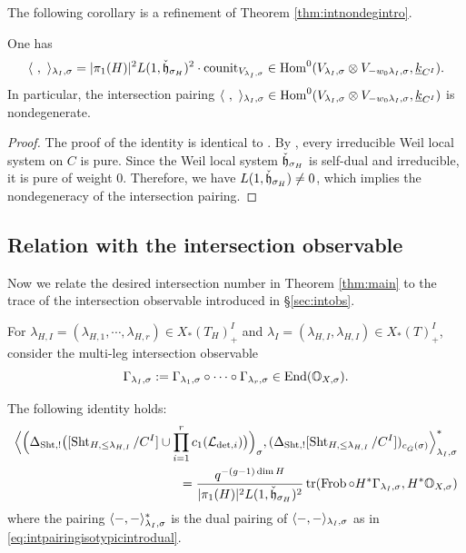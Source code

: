 \documentclass[reqno]{amsart}
\numberwithin{equation}{section}
\numberwithin{equation}{section}
\begin{document}
The following corollary is a refinement of Theorem \ref{thm:intnondegintro}.
\begin{cor}\label{cor:intnondegenerate}
    One has \begin{equation}
        \langle~,~\rangle_{\lambda_I,\sigma}=|\pi_1(H)|^2L(1, \check{\mathfrak{h}}_{\sigma_H})^2\cdot  \mathrm{counit}_{V_{\lambda_I,\sigma}}\in \operatorname{Hom}^0(V_{\lambda_I,\sigma}\otimes V_{-w_0\lambda_I,\sigma}, \underline{k}_{C^I})
    .\end{equation} In particular, the intersection pairing $\langle~,~\rangle_{\lambda_I,\sigma}\in \operatorname{Hom}^0(V_{\lambda_I,\sigma}\otimes V_{-w_0\lambda_I,\sigma}, \underline{k}_{C^I})$ is nondegenerate.
\end{cor}


\begin{proof}
    The proof of the identity is identical to \cite[\S6.3.2]{wang2025specialcycleshtukascategorical}. By \cite{lafforgue2002chtoucas}, every irreducible Weil local system on $C$ is pure. Since the Weil local system $\check{\mathfrak{h}}_{\sigma_H}$ is self-dual and irreducible, it is pure of weight $0$. Therefore, we have $L(1,\check{\mathfrak{h}}_{\sigma_H})\neq 0$, which implies the nondegeneracy of the intersection pairing.
\end{proof}

\subsection{Relation with the intersection observable}
Now we relate the desired intersection number in Theorem \ref{thm:main} to the trace of the intersection observable introduced in \S\ref{sec:intobs}.

For $\lambda_{H,I}=(\lambda_{H,1},\cdots,\lambda_{H,r})\in X_*(T_H)_+^I$ and $\lambda_I=(\lambda_{H,I},\lambda_{H,I})\in X_*(T)_+^I$, consider the multi-leg intersection observable \begin{equation}
    \Gamma_{\lambda_I,\sigma}:= \Gamma_{\lambda_1,\sigma}\circ \cdots\circ \Gamma_{\lambda_r,\sigma}\in \operatorname{End}(\mathbb{O}_{X,\sigma}) .\end{equation} 

\begin{lemma}\label{lem:intnumber=trace}
    The following identity holds: \begin{equation}\begin{split}
        \Bigl\langle \Bigl(\Delta_{\operatorname{Sht},!}\bigl([\operatorname{Sht}_{H,\leq\lambda_{H,I}}/C^I]\cup \prod_{i=1}^r c_1(\mathcal{L}_{\det,i})\bigr)\Bigr)_{\sigma} , (\Delta_{\operatorname{Sht},!}[\operatorname{Sht}_{H,\leq\lambda_{H,I}}/C^I])_{c_{\check{G}}(\sigma)} \Bigr\rangle^*_{\lambda_I,\sigma} \\ =  \frac{q^{-(g-1)\dim H}}{|\pi_1(H)|^2L(1, \check{\mathfrak{h}}_{\sigma_H})^2} \operatorname{tr}(\operatorname{Frob}\circ H^*\Gamma_{\lambda_I,\sigma}, H^*\mathbb{O}_{X,\sigma}) \end{split} 
    \end{equation} where the pairing $\langle-,-\rangle^*_{\lambda_I,\sigma}$ is the dual pairing of $\langle-,-\rangle_{\lambda_I,\sigma}$ as in \eqref{eq:intpairingisotypicintrodual}.
\end{lemma}
\end{document}
